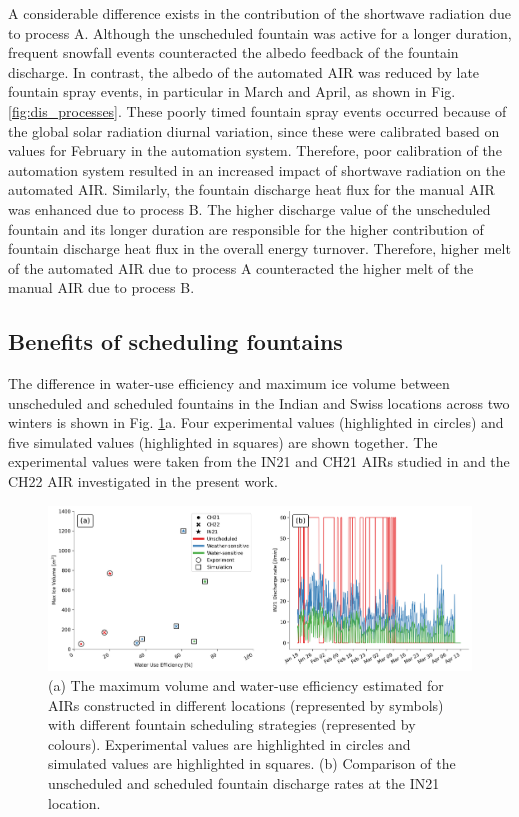 \documentclass[tc, manuscript]{copernicus}
\begin{document}
A considerable difference exists in the contribution of the shortwave radiation due to process A. Although the unscheduled fountain was active for a longer duration, frequent snowfall events
counteracted the albedo feedback of the fountain discharge. In contrast, the albedo of the automated AIR was
reduced by late fountain spray events, in particular in March and April, as shown in Fig.
\ref{fig:dis_processes}. These poorly timed fountain spray events occurred because of the global solar radiation
diurnal variation, since these were calibrated based on values for February in the automation system.
Therefore, poor calibration of the automation system resulted in an increased impact of shortwave radiation on
the automated AIR. Similarly, the fountain discharge heat flux for the manual AIR was enhanced due to
process B. The higher discharge value of the unscheduled fountain and its longer duration are responsible
for the higher contribution of fountain discharge heat flux in the overall energy turnover. Therefore, higher
melt of the automated AIR due to process A counteracted the higher melt of the manual AIR due to process B.

\subsection{Benefits of scheduling fountains}

The difference in water-use efficiency and maximum ice volume between unscheduled and scheduled fountains in the Indian and Swiss
locations across two winters is shown in Fig. \ref{fig:wue}a. Four experimental values (highlighted in
circles) and five simulated values (highlighted in squares) are shown together.  The experimental values were
taken from the IN21 and CH21 AIRs studied in \citet{balasubramanianInfluenceMeteorologicalConditions2022} and
the CH22 AIR investigated in the present work. 

\begin{figure}[htb]
\includegraphics[width=\textwidth]{Figures/wue.png}

\caption{(a) The maximum volume and water-use efficiency estimated for AIRs constructed in different locations
(represented by symbols) with different fountain scheduling strategies (represented by colours). Experimental
values are highlighted in circles and simulated values are highlighted in squares. (b) Comparison of
the unscheduled and scheduled fountain discharge rates at the IN21 location.}

\label{fig:wue}
\end{figure}
\end{document}
